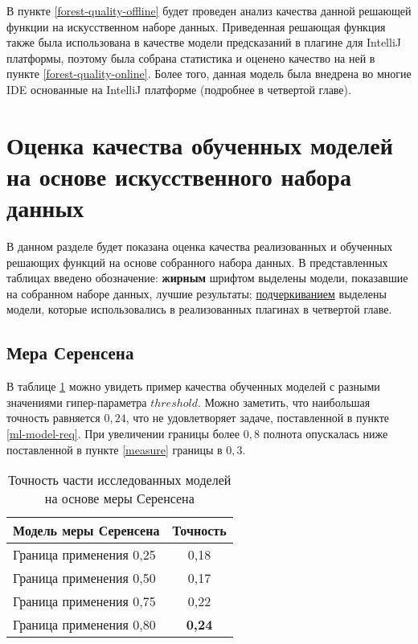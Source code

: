 В пункте \ref{forest-quality-offline} будет проведен анализ качества данной решающей функции на искусственном наборе данных. Приведенная решающая функция также была использована в качестве модели предсказаний в плагине для IntelliJ платформы, поэтому была собрана статистика и оценено качество на ней в пункте \ref{forest-quality-online}. Более того, данная модель была внедрена во многие IDE основанные на IntelliJ платформе (подробнее в четвертой главе).
\section{Оценка качества обученных моделей на основе искусственного набора данных}\label{offline-measure}
В данном разделе будет показана оценка качества реализованных и обученных решающих функций на основе собранного набора данных. В представленных таблицах введено обозначение: \textbf{жирным} шрифтом выделены модели, показавшие на собранном наборе данных, лучшие результаты; \uline{подчеркиванием} выделены модели, которые использовались в реализованных плагинах в четвертой главе.
    \subsection{Мера Серенсена}\label{coef-quality}
В таблице \ref{ser-offline-result-table} можно увидеть пример качества обученных моделей с разными значениями гипер-параметра $threshold$. Можно заметить, что наибольшая точность равняется $0,24$, что не удовлетворяет задаче, поставленной в пункте \ref{ml-model-req}. При увеличении границы более $0,8$ полнота опускалась ниже поставленной в пункте \ref{measure} границы в $0,3$.
        \begin{table}[!h]
        \caption{Точность части исследованных моделей на основе меры Серенсена}\label{ser-offline-result-table}
        \centering
        \begin{tabular}{|l|c|}\hline
        \multicolumn{1}{|c|}{\textbf{Модель меры Серенсена}} & \textbf{Точность}\\\hline
        Граница применения 0,25 & 0,18 \\\hline
        Граница применения 0,50 & 0,17 \\\hline
        Граница применения 0,75 & 0,22 \\\hline
        Граница применения 0,80 & \textbf{0,24} \\\hline
        \end{tabular}
        \end{table}
